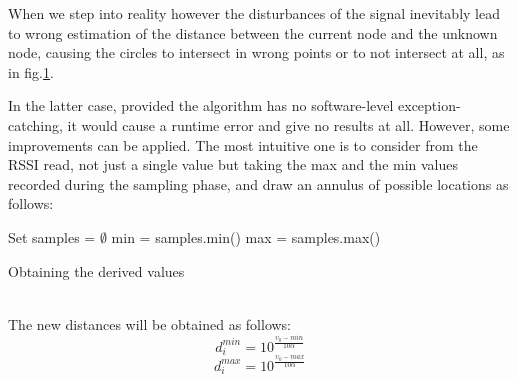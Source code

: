 \documentclass[12pt,twoside]{report}
\begin{document}
When we step into reality however the disturbances of the signal inevitably lead to wrong estimation of the distance between the current node and the unknown node, causing the circles to intersect in wrong points or to not intersect at all, as in fig.\ref{fig:trilKO}.
\begin{figure}
    \centering
    \caption{}
    \label{fig:trilKO}
\end{figure}
In the latter case, provided the algorithm has no software-level exception-catching, it would cause a runtime error and give no results at all. However, some improvements can be applied. The most intuitive one is to consider from the RSSI read, not just a single value but taking the max and the min values recorded during the sampling phase, and draw an annulus of possible locations as follows:
\begin{algorithm}[H]
\SetAlgoLined
{}
 Set samples = $\emptyset$\;
 min = samples.min()\;
 max = samples.max()\;
 \caption{Obtaining the derived values}
\end{algorithm}
\noindent\\The new distances will be obtained as follows:
\begin{equation}
    d_i^{min}=10^{\frac{\upsilon_0-min}{10\alpha}}    
\end{equation}
\begin{equation}
    d_i^{max}=10^{\frac{\upsilon_0-max}{10\alpha}}    
\end{equation}
\end{document}
